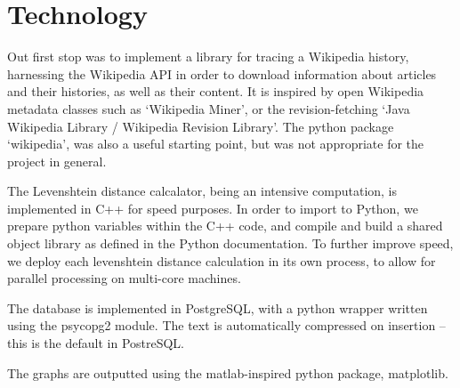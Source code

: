 \section{Technology}
Out first stop was to implement a library for tracing a Wikipedia
history, harnessing the Wikipedia API in order to download information
about articles and their histories, as well as their content. It is
inspired by open Wikipedia metadata classes such as `Wikipedia
Miner'\cite{wiki-miner}, or the revision-fetching `Java Wikipedia
Library / Wikipedia Revision
Library'.\cite{wiki-java}\cite{Ferschke2011} The python package
`wikipedia',\cite{python-wikipedia} was also a useful starting point,
but was not appropriate for the project in general.

The Levenshtein distance calcalator, being an intensive computation,
is implemented in C++ for speed purposes. In order to import to
Python, we prepare python variables within the C++ code, and compile
and build a shared object library as defined in the Python
documentation.\cite{python-extend-c++} To further improve speed, we
deploy each levenshtein distance calculation in its own process, to
allow for parallel processing on multi-core machines.

The database is implemented in PostgreSQL, with a python wrapper
written using the psycopg2 module.\cite{psycopg2} The text is
automatically compressed on insertion -- this is the default in
PostreSQL.\cite{psql-comp} 

The graphs are outputted using the matlab-inspired python package,
matplotlib.\cite{matplotlib} 
